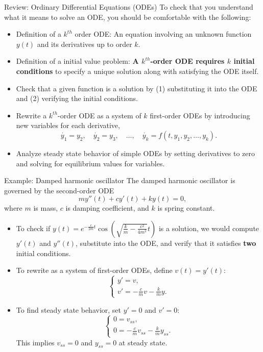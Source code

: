 \documentclass{beamer}
\begin{document}
\begin{frame}{Review: Ordinary Differential Equations (ODEs)}
To check that you understand what it means to solve an ODE, you should be comfortable with the following:
\begin{itemize}
\item Definition of a $k^{th}$ order ODE: An equation involving an unknown function $y(t)$ and its derivatives up to order $k$.
\item Definition of a initial value problem: \textbf{A $k^{th}$-order ODE requires $k$ initial conditions} to specify a unique solution along with satisfying the ODE itself.
\item Check that a given function is a solution by (1) substituting it into the ODE and (2) verifying the initial conditions.
\item Rewrite a $k^{th}$-order ODE as a system of $k$ first-order ODEs by introducing new variables for each derivative,
\[
\dot{y_1} = y_2, \quad \dot{y_2} = y_3, \quad \ldots, \quad \dot{y_k} = f(t,y_1,y_2,\ldots,y_k).
\]
\item Analyze steady state behavior of simple ODEs by setting derivatives to zero and solving for equilibrium values for variables.
\end{itemize}
\end{frame}

\begin{frame}{Example: Damped harmonic oscillator}
The damped harmonic oscillator is governed by the second-order ODE
\[
  m y''(t) + c y'(t) + k y(t) = 0,
\]
where $m$ is mass, $c$ is damping coefficient, and $k$ is spring constant.
\begin{itemize}
  \item To check if \(y(t) = e^{-\frac{c}{2m}t} \cos\left(\sqrt{\frac{k}{m} - \frac{c^2}{4m^2}} t\right)\) is a solution, we would compute \(y'(t)\) and \(y''(t)\), substitute into the ODE, and verify that it satisfies \textbf{two} initial conditions.
  \item To rewrite as a system of first-order ODEs, define \(v(t) = y'(t)\):
  \[
    \begin{cases}
      y' = v, \\
      v' = -\frac{c}{m} v - \frac{k}{m} y.
    \end{cases}
  \]
  \item To find steady state behavior, set \(y' = 0\) and \(v' = 0\):
  \[
    \begin{cases}
      0 = v_{ss}, \\
      0 = -\frac{c}{m} v_{ss} - \frac{k}{m} y_{ss}.
    \end{cases}
  \]
  This implies \(v_{ss} = 0\) and \(y_{ss} = 0\) at steady state.
\end{itemize}

\end{frame}
\end{document}
